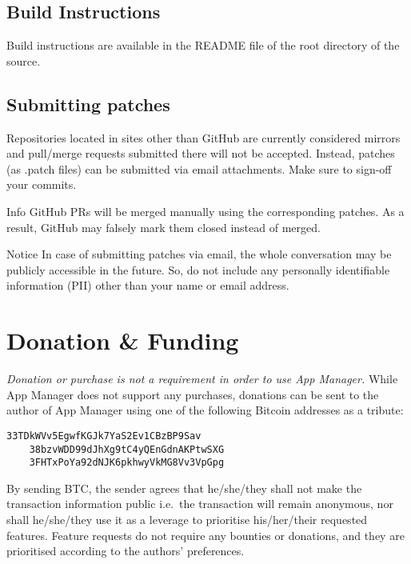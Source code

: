 \subsection{Build Instructions}\label{sec:build-instructions} %
Build instructions are available in the README file of the root directory of the source.

\subsection{Submitting patches}\label{subsec:submitting-patches} %
Repositories located in sites other than GitHub are currently considered mirrors and pull/merge requests submitted there
will not be accepted. Instead, patches (as .patch files) can be submitted via email attachments. Make sure to sign-off
your commits.

\begin{tip}{Info}
    GitHub PRs will be merged manually using the corresponding patches. As a result, GitHub may falsely mark them closed
    instead of merged.
\end{tip}

\begin{warning}{Notice}
    In case of submitting patches via email, the whole conversation may be publicly accessible in the future. So, do not
    include any personally identifiable information (PII) other than your name or email address.
\end{warning}

\section{Donation \& Funding}\label{sec:donation-&-funding} %
\emph{Donation or purchase is not a requirement in order to use App Manager.} While App Manager does not support any
purchases, donations can be sent to the author of App Manager using one of the following Bitcoin addresses as a tribute:
\begin{Verbatim}[label={verb:btc-donation}]
    33TDkWVv5EgwfKGJk7YaS2Ev1CBzBP9Sav
    38bzvWDD99dJhXg9tC4yQEnGdnAKPtwSXG
    3FHTxPoYa92dNJK6pkhwyVkMG8Vv3VpGpg
\end{Verbatim}

By sending BTC, the sender agrees that he/she/they shall not make the transaction information public i.e.\ the
transaction will remain anonymous, nor shall he/she/they use it as a leverage to prioritise his/her/their requested
features. Feature requests do not require any bounties or donations, and they are prioritised according to the authors'
preferences.

